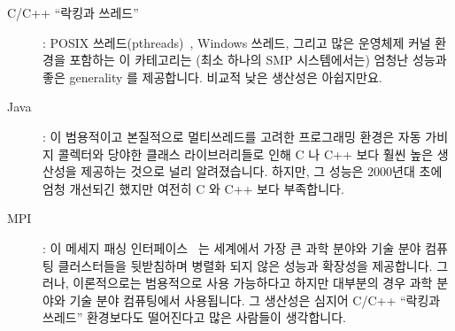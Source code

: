 \begin{description}
\item[C/C++ ``락킹과 쓰레드'']: POSIX
	쓰레드(pthreads)~\cite{OpenGroup1997pthreads}, Windows 쓰레드, 그리고
	많은 운영체제 커널 환경을 포함하는 이 카테고리는 (최소 하나의 SMP
	시스템에서는) 엄청난 성능과 좋은 generality 를 제공합니다.
	비교적 낮은 생산성은 아쉽지만요.

\item[Java]: 이 범용적이고 본질적으로 멀티쓰레드를 고려한 프로그래밍 환경은
	자동 가비지 콜렉터와 당야한 클래스 라이브러리들로 인해 C 나 C++ 보다
	훨씬 높은 생산성을 제공하는 것으로 널리 알려졌습니다.
	하지만, 그 성능은 2000년대 초에 엄청 개선되긴 했지만 여전히 C 와 C++
	보다 부족합니다.

\item[MPI]: 이 메세지 패싱 인터페이스~\cite{MPIForum2008} 는 세계에서 가장 큰
	과학 분야와 기술 분야 컴퓨팅 클러스터들을 뒷받침하며 병렬화 되지 않은
	성능과 확장성을 제공합니다.
	그러나, 이론적으로는 범용적으로 사용 가능하다고 하지만 대부분의 경우
	과학 분야와 기술 분야 컴퓨팅에서 사용됩니다.
	그 생산성은 심지어 C/C++ ``락킹과 쓰레드'' 환경보다도 떨어진다고 많은
	사람들이 생각합니다.

\end{description}
